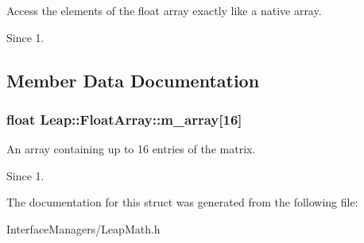 Access the elements of the float array exactly like a native array. \begin{DoxySince}{Since}
1. 
\end{DoxySince}


\subsection{Member Data Documentation}
\hypertarget{struct_leap_1_1_float_array_a6f3a08d99f887c2f7afeb90955565a90}{
\subsubsection[{m\+\_\+array}]{\setlength{\rightskip}{0pt plus 5cm}float Leap\+::\+Float\+Array\+::m\+\_\+array\mbox{[}16\mbox{]}}}\label{struct_leap_1_1_float_array_a6f3a08d99f887c2f7afeb90955565a90}
An array containing up to 16 entries of the matrix. \begin{DoxySince}{Since}
1. 
\end{DoxySince}


The documentation for this struct was generated from the following file\+:\begin{DoxyCompactItemize}
\item 
Interface\+Managers/Leap\+Math.\+h\end{DoxyCompactItemize}
